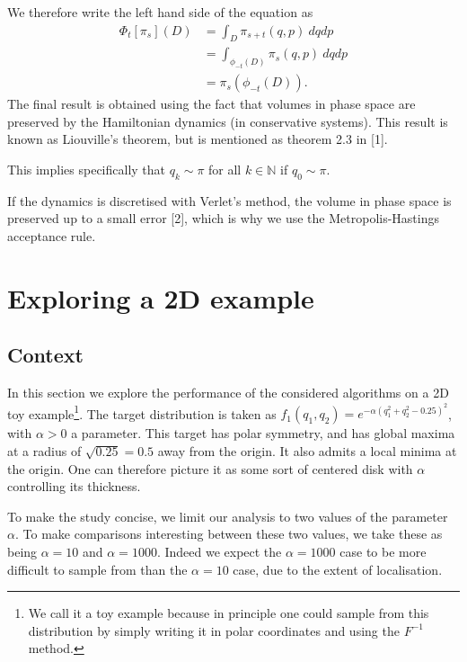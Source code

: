 \documentclass[a4paper, 12pt,oneside]{article}
\begin{document}
			We therefore write the left hand side of the equation as
			\begin{align}
				\Phi_t[\pi_s](D)&=\int_D \pi_{s+t}(q,p)\ dqdp \\
					&=\int_{\phi_{-t}(D)}\pi_{s}(q,p)\ dqdp \\
					&=\pi_s(\phi_{-t}(D)).
			\end{align}
			The final result is obtained using the fact that volumes in phase space are preserved by the Hamiltonian dynamics (in conservative systems). This result is known as Liouville's theorem, but is mentioned as theorem 2.3 in [1].
	
			This implies specifically that $q_k\sim\pi$ for all $k\in\mathbb{N}$ if $q_0\sim \pi$. 
	
			If the dynamics is discretised with Verlet's method, the volume in phase space is preserved up to a small error [2], which is why we use the Metropolis-Hastings acceptance rule.
	\section{Exploring a 2D example}
		\subsection{Context}
		In this section we explore the performance of the considered algorithms on a 2D toy example\footnote{We call it a toy example because in principle one could sample from this distribution by simply writing it in polar coordinates and using the $F^{-1}$ method.}. The target distribution is taken as $f_1(q_1,q_2)=e^{-\alpha(q_1^2+q_2^2-0.25)^2}$, with $\alpha>0$ a parameter. 
		This target has polar symmetry, and has global maxima at a radius of $\sqrt{0.25}=0.5$ away from the origin. It also admits a local minima at the origin. One can therefore picture it as some sort of centered disk with $\alpha$ controlling its thickness. 
		
		To make the study concise, we limit our analysis to two values of the parameter $\alpha$. To make comparisons interesting between these two values, we take these as being $\alpha =10$ and $\alpha=1000$. Indeed we expect the $\alpha=1000$ case to be more difficult to sample from than the $\alpha=10$ case, due to the extent of localisation.
\end{document}
